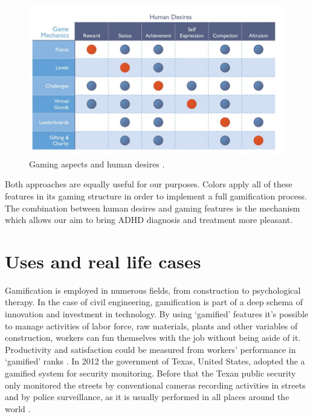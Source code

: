 \begin{figure}[h]
	\begin{center}
		\includegraphics[scale=0.5]{chapters/gamification/img/gaming.jpg}
		\caption{Gaming aspects and human desires \citep{Bunchball}.}
		\label{taxonomy_1}
	\end{center}
\end{figure}

Both approaches are equally useful for our purposes. Colors apply all of these features in its gaming structure in order to implement a full gamification process. The combination between human desires and gaming features is the mechanism which allows our aim to bring ADHD diagnosis and treatment more pleasant.


\section{Uses and real life cases}

Gamification is employed in numerous fields, from construction to psychological therapy.  In the case of civil engineering, gamification is part of a deep schema of innovation and investment in technology. By using `gamified' features it's possible to manage activities of labor force, raw materials, plants and other variables of construction, workers can fun themselves with the job without being aside of it. Productivity and satisfaction could be measured from workers' performance in `gamified' ranks  \citep{formoso}. In 2012 the government of Texas, United States, adopted the a gamified system for security monitoring. Before that the Texan public security only monitored the streets by conventional cameras recording activities in streets and by police surveillance, as it is usually performed in all places around the world \citep{conf/cts/Aud13}.

